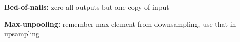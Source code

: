 \textbf{Bed-of-nails:} zero all outputs but one copy of input\\

\textbf{Max-unpooling:} remember max element from downsampling, use that in upsampling\\

